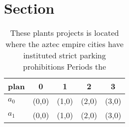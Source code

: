 \documentclass[a4paper]{article}
\begin{document}
\section{Section}

\begin{table}
\begin{adjustbox}{width=0.9\columnwidth}
\begin{tabular}{|l|l|l|l|l|}
\hline
\textbf{plan} & \multicolumn{1}{c|}{\textbf{0}} & \multicolumn{1}{c|}{\textbf{1}} & \multicolumn{1}{c|}{\textbf{2}} & \multicolumn{1}{c|}{\textbf{3}} \\ \hline
\textbf{$a_0$}  & (0,0) & (1,0) & (2,0) & (3,0) \\ \hline
\textbf{$a_1$}  & (0,0) & (1,0) & (2,0) & (3,0) \\ \hline
\end{tabular}
\end{adjustbox}
\caption{These plants projects is located where the aztec empire cities have instituted strict parking prohibitions Periods the 
}
\end{table}
\end{document}
